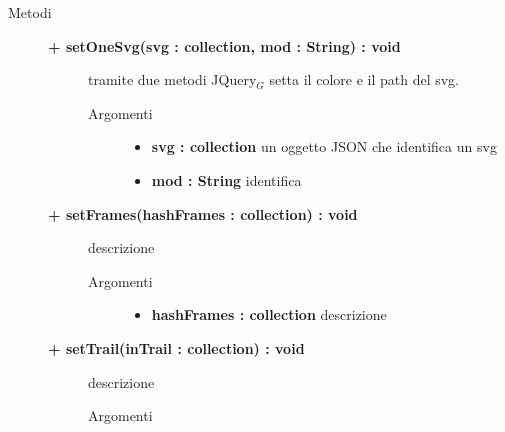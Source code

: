 \begin{description}
	
\item[Metodi] \hfill

	\begin{description}
		\item[\textbf{\color{blue}+ setOneSvg(svg : collection, mod : String) : void			}] \hfill
		tramite due metodi JQuery$_G$ setta il colore e il path del svg.		
			
		\begin{description}
			\item[Argomenti] \hfill
				\begin{itemize}
				
					\item \textbf{svg : collection			} \hfill
						un oggetto JSON che identifica un svg
					\item \textbf{mod : String			} \hfill
						identifica %
				\end{itemize}
		\end{description}
	\end{description}
	
	\begin{description}
		\item[\textbf{\color{blue}+ setFrames(hashFrames : collection) : void			}] \hfill
			descrizione %
			
		\begin{description}
			\item[Argomenti] \hfill
				\begin{itemize}
				
					\item \textbf{hashFrames : collection			} \hfill
					descrizione %
					
				\end{itemize}
		\end{description}
	\end{description}
	
	\begin{description}
		\item[\textbf{\color{blue}+ setTrail(inTrail : collection) : void			}] \hfill
			descrizione %
			
		\begin{description}
			\item[Argomenti] \hfill
				\begin{itemize}
				

\end{itemize}
\end{description}
\end{description}
\end{description}
